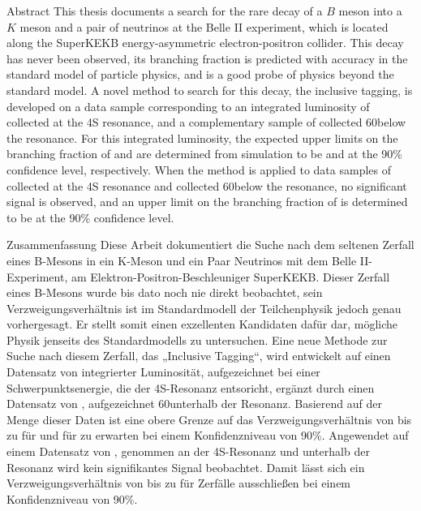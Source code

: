 \begin{abstractpage}{Abstract}
This thesis documents a search for the rare decay of a $B$ meson into a $K$ meson and a pair of neutrinos at the Belle II experiment, which is located along the SuperKEKB energy-asymmetric electron-positron collider.
This decay has never been observed, its branching fraction is predicted with accuracy in the standard model of particle physics, and is a good probe of physics beyond the standard model.
A novel method to search for this decay, the inclusive tagging, is developed on a data sample corresponding to an integrated luminosity of \lumion collected at the \Y4S resonance, and a complementary sample of \lumioff collected 60\mev below the resonance.
For this integrated luminosity, the expected upper limits on the branching fraction of \BKpnn and \BKznn are determined from simulation to be \limitKp and \limitKz at the 90\% confidence level, respectively.
When the method is applied to data samples of \lumionpartial collected at the \Y4S resonance and \lumioffpartial collected 60\mev below the resonance, no significant signal is observed, and an upper limit on the branching fraction of \BKpnn is determined to be \limitKppartial at the 90\% confidence level.
\end{abstractpage}
\begin{abstractpage}{Zusammenfassung}
Diese Arbeit dokumentiert die Suche nach dem seltenen Zerfall eines B-Mesons in ein K-Meson und ein Paar Neutrinos mit dem Belle II-Experiment, am Elektron-Positron-Beschleuniger SuperKEKB.
Dieser Zerfall eines B-Mesons wurde bis dato noch nie direkt beobachtet, sein Verzweigungsverhältnis ist im Standardmodell der Teilchenphysik jedoch genau vorhergesagt. Er stellt somit einen exzellenten Kandidaten dafür dar, mögliche Physik jenseits des Standardmodells zu untersuchen.
Eine neue Methode zur Suche nach diesem Zerfall, das „Inclusive Tagging“, wird entwickelt auf einen Datensatz von \lumion integrierter Luminosität, aufgezeichnet bei einer Schwerpunktsenergie, die der \Y4S-Resonanz entsoricht, ergänzt durch einen Datensatz von \lumioff, aufgezeichnet 60\mev unterhalb der Resonanz.
Basierend auf der Menge dieser Daten ist eine obere Grenze auf das Verzweigungsverhältnis von bis zu \limitKp für \BKpnn und \limitKz für \BKznn zu erwarten bei einem Konfidenzniveau von 90\%.
Angewendet auf einem Datensatz von \lumionpartial, genommen an der \Y4S-Resonanz und \lumioffpartial unterhalb der Resonanz wird kein signifikantes Signal beobachtet.
Damit lässt sich ein Verzweigungsverhältnis von bis zu \limitKppartial für \BKpnn Zerfälle ausschließen bei einem Konfidenzniveau von 90\%.
\end{abstractpage}
